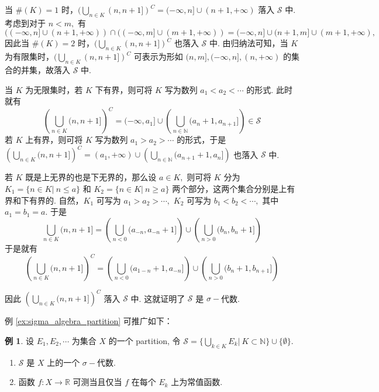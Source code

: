 \documentclass[12pt, a4paper, oneside]{book}
\numberwithin{figure}{section}
\theoremstyle{definition}
\newtheorem{example}[theorem]{例}
\begin{document}
当 $\#(K)=1$ 时，$(\bigcup_{n\in K}(n,n+1])^C=(-\infty,n]\cup (n+1,+\infty)$ 落入 $\mathcal S$ 中. 
考虑到对于 $n<m,$ 有 $((-\infty,n]\cup (n+1,+\infty))\cap ((-\infty,m]\cup (m+1,+\infty))=(-\infty,n]\cup (n+1,m]\cup (m+1,+\infty),$ 因此当 $\#(K)=2$ 时，$(\bigcup_{n\in K}(n,n+1])^C$ 也落入 $\mathcal S$ 中. 
由归纳法可知，当 $K$ 为有限集时，$(\bigcup_{n\in K}(n,n+1])^C$ 可表示为形如 $(n,m],(-\infty,n],(n,+\infty)$ 的集合的并集，故落入 $\mathcal S$ 中.

当 $K$ 为无限集时，若 $K$ 下有界，则可将 $K$ 写为数列 $a_1<a_2<\cdots$ 的形式. 此时就有 
\begin{equation}
    \left(\bigcup_{n\in K}(n,n+1]\right)^C = (-\infty,a_1]\cup \left(\bigcup_{n\in\mathbb N} (a_n+1,a_{n+1}]\right)\in\mathcal S
\end{equation}
若 $K$ 上有界，则可将 $K$ 写为数列 $a_1>a_2>\cdots$ 的形式，于是 $\left(\bigcup_{n\in K}(n,n+1]\right)^C = (a_1,+\infty)\cup\left(\bigcup_{n\in\mathbb N} (a_{n+1}+1,a_{n}]\right)$ 也落入 $\mathcal S$ 中. 

若 $K$ 既是上无界的也是下无界的，那么设 $a\in K,$ 则可将 $K$ 分为 $K_1=\{n\in K|\ n\leq a\}$ 和 $K_2=\{n\in K|\ n\geq a\}$ 两个部分，这两个集合分别是上有界和下有界的. 自然，$K_1$ 可写为 $a_1>a_2>\cdots,$ $K_2$ 可写为 $b_1<b_2<\cdots,$ 其中 $a_1=b_1=a.$ 于是 
\begin{equation}
    \bigcup_{n\in K}(n,n+1] = \left(\bigcup_{n<0} (a_{-n},a_{-n}+1]\right) \cup \left(\bigcup_{n>0} (b_n,b_{n}+1]\right)
\end{equation}
于是就有 
\begin{equation}
    \left(\bigcup_{n\in K}(n,n+1]\right)^C =\left(\bigcup_{n<0} (a_{1-n}+1,a_{-n}]\right) \cup \left(\bigcup_{n>0} (b_n+1,b_{n+1}]\right)
\end{equation}


因此 $\left(\bigcup_{n\in K}(n,n+1]\right)^C$ 落入 $\mathcal S$ 中. 这就证明了 $\mathcal S$ 是 $\sigma-$代数.

例 \ref{ex:sigma_algebra_partition} 可推广如下：
\begin{example}\label{ex:sigma_algebra_partition_general}
    设 $E_1,E_2,\cdots$ 为集合 $X$ 的一个 partition, 令 $\mathcal S=\{\bigcup_{k\in K}E_k|\ K\subset\mathbb N\}\cup\{\emptyset\}.$ 
    \begin{enumerate}[label=\alph*)]
        \item $\mathcal S$ 是 $X$ 上的一个 $\sigma-$代数.
        \item 函数 $f:X\to\mathbb R$ 可测当且仅当 $f$ 在每个 $E_k$ 上为常值函数.
    \end{enumerate}
\end{example}
\end{document}
